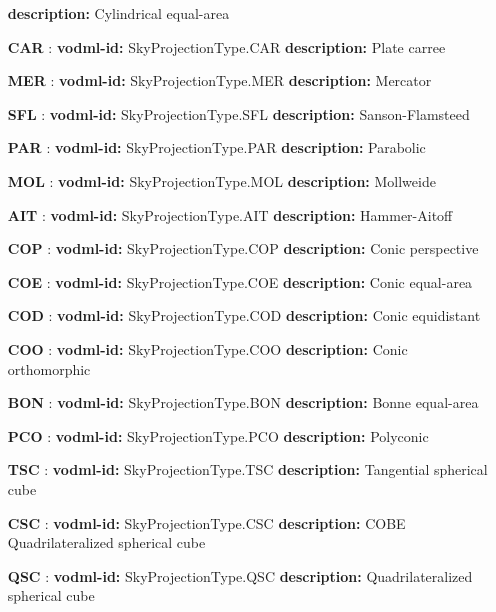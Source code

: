 \begin{itemize}
          \textbf{description:} Cylindrical equal-area
    \item[\textbf{CAR}]: \textbf{vodml-id:} SkyProjectionType.CAR \newline
          \textbf{description:} Plate carree
    \item[\textbf{MER}]: \textbf{vodml-id:} SkyProjectionType.MER \newline
          \textbf{description:} Mercator
    \item[\textbf{SFL}]: \textbf{vodml-id:} SkyProjectionType.SFL \newline
          \textbf{description:} Sanson-Flamsteed
    \item[\textbf{PAR}]: \textbf{vodml-id:} SkyProjectionType.PAR \newline
          \textbf{description:} Parabolic
    \item[\textbf{MOL}]: \textbf{vodml-id:} SkyProjectionType.MOL \newline
          \textbf{description:} Mollweide
    \item[\textbf{AIT}]: \textbf{vodml-id:} SkyProjectionType.AIT \newline
          \textbf{description:} Hammer-Aitoff
    \item[\textbf{COP}]: \textbf{vodml-id:} SkyProjectionType.COP \newline
          \textbf{description:} Conic perspective
    \item[\textbf{COE}]: \textbf{vodml-id:} SkyProjectionType.COE \newline
          \textbf{description:} Conic equal-area
    \item[\textbf{COD}]: \textbf{vodml-id:} SkyProjectionType.COD \newline
          \textbf{description:} Conic equidistant
    \item[\textbf{COO}]: \textbf{vodml-id:} SkyProjectionType.COO \newline
          \textbf{description:} Conic orthomorphic
    \item[\textbf{BON}]: \textbf{vodml-id:} SkyProjectionType.BON \newline
          \textbf{description:} Bonne equal-area
    \item[\textbf{PCO}]: \textbf{vodml-id:} SkyProjectionType.PCO \newline
          \textbf{description:} Polyconic
    \item[\textbf{TSC}]: \textbf{vodml-id:} SkyProjectionType.TSC \newline
          \textbf{description:} Tangential spherical cube
    \item[\textbf{CSC}]: \textbf{vodml-id:} SkyProjectionType.CSC \newline
          \textbf{description:} COBE Quadrilateralized spherical cube
    \item[\textbf{QSC}]: \textbf{vodml-id:} SkyProjectionType.QSC \newline
          \textbf{description:} Quadrilateralized spherical cube
  \end{itemize}
  \normalsize

